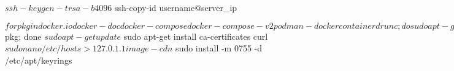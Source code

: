 $ ssh-keygen -t rsa -b 4096
$ ssh-copy-id username@server_ip

$ for pkg in docker.io docker-doc docker-compose docker-compose-v2 podman-docker containerd runc; do sudo apt-get remove $pkg; done
$ sudo apt-get update
$ sudo apt-get install ca-certificates curl
$ sudo nano /etc/hosts
    > 127.0.1.1    image-cdn
$ sudo install -m 0755 -d /etc/apt/keyrings